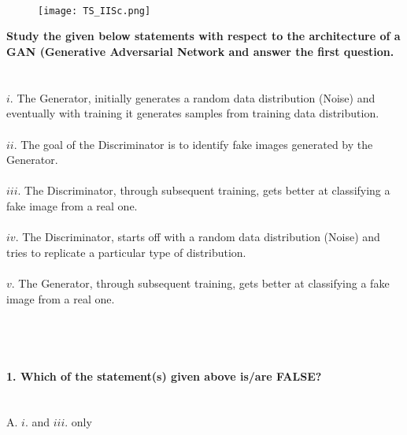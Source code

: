 \documentclass[prl,twocolumn,showpacs,preprintnumbers,superscriptaddress]{revtex4}
\theoremstyle{plain}
\theoremstyle{definition}
\begin{document}
\begin{widetext}
\\
\\
\\

\begin{wrapfigure}
\centering
\end{wrapfigure}
\begin{figure}[h!]
 \begin{right}
  \hfill\texttt{[image: TS\_IISc.png]}
 \end{right}
\end{figure}
\noindent\textbf{Study the given below statements with respect to the architecture of a GAN (Generative Adversarial Network and answer the first question.}
\\
\\
\\
$i.$ The Generator, initially generates a random data distribution (Noise) and eventually with training it generates samples from training data distribution.
\\
\\
$ii.$ The goal of the Discriminator is to identify fake images generated by the Generator. 
\\
\\
$iii.$ The Discriminator, through subsequent training, gets better at classifying a fake image from a real one.
\\
\\
$iv.$ The Discriminator, starts off with a random data distribution (Noise) and tries to replicate a particular type of distribution.
\\
\\
$v.$ The Generator, through subsequent training, gets better at classifying a fake image from a real one.
\\
\\
\\
\\
\\
\textbf{1. Which of the statement(s) given above is/are FALSE?}
\\
\\
\\
A. $i.$ and $iii.$ only
\\
\\

\end{widetext}
\end{document}
